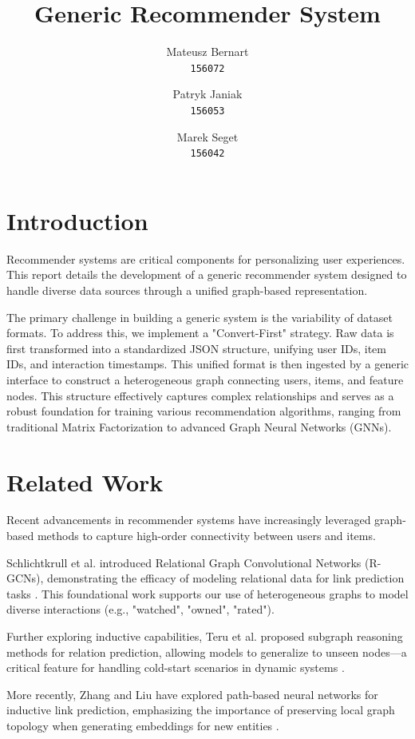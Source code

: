 \documentclass{article}
\title{Generic Recommender System}
\author{
  Mateusz Bernart\\
  \texttt{156072}
  \and
  Patryk Janiak\\
  \texttt{156053}
  \and
  Marek Seget\\
  \texttt{156042}
}
\begin{document}
\maketitle

\section{Introduction}
Recommender systems are critical components for personalizing user experiences. This report details the development of a generic recommender system designed to handle diverse data sources through a unified graph-based representation. 

The primary challenge in building a generic system is the variability of dataset formats. To address this, we implement a "Convert-First" strategy. Raw data is first transformed into a standardized JSON structure, unifying user IDs, item IDs, and interaction timestamps. This unified format is then ingested by a generic interface to construct a heterogeneous graph connecting users, items, and feature nodes. This structure effectively captures complex relationships and serves as a robust foundation for training various recommendation algorithms, ranging from traditional Matrix Factorization to advanced Graph Neural Networks (GNNs).

\section{Related Work}
Recent advancements in recommender systems have increasingly leveraged graph-based methods to capture high-order connectivity between users and items. 

Schlichtkrull et al. introduced Relational Graph Convolutional Networks (R-GCNs), demonstrating the efficacy of modeling relational data for link prediction tasks \cite{schlichtkrull2018modeling}. This foundational work supports our use of heterogeneous graphs to model diverse interactions (e.g., "watched", "owned", "rated").

Further exploring inductive capabilities, Teru et al. proposed subgraph reasoning methods for relation prediction, allowing models to generalize to unseen nodes—a critical feature for handling cold-start scenarios in dynamic systems \cite{teru2020inductive}.

More recently, Zhang and Liu have explored path-based neural networks for inductive link prediction, emphasizing the importance of preserving local graph topology when generating embeddings for new entities \cite{zhang2023inductive}.
\end{document}
